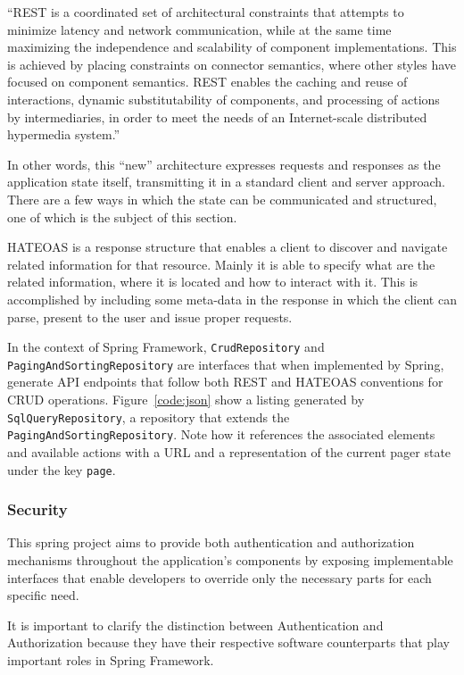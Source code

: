 \begin{displayquote}
  ``REST is a coordinated set of architectural constraints that attempts to minimize latency and network communication, while at the same time maximizing the independence and scalability of component implementations. This is achieved  by  placing  constraints  on  connector  semantics,  where  other  styles have focused on component semantics. REST enables the caching and reuse of interactions, dynamic substitutability of components, and processing of actions by intermediaries, in order to meet the needs of an Internet-scale distributed hypermedia system.''~\cite{fielding}
\end{displayquote}

In other words, this ``new'' architecture expresses requests and responses as the application state itself, transmitting it in a standard client and server approach. There are a few ways in which the state can be communicated and structured, one of which is the subject of this section. 

\gls{HATEOAS} is a response structure that enables a client to discover and navigate related information for that resource\cite{fielding}. Mainly it is able to specify what are the related information, where it is located and how to interact with it. This is accomplished by including some meta-data in the response in which the client can parse, present to the user and issue proper requests.

In the context of Spring Framework, \texttt{CrudRepository} and \texttt{PagingAndSortingRepository} are interfaces that when implemented by Spring, generate \gls{API} endpoints that follow both \gls{REST} and \gls{HATEOAS} conventions for \gls{CRUD} operations. Figure~\ref{code:json} show a listing generated by \texttt{SqlQueryRepository}, a repository that extends the \texttt{PagingAndSortingRepository}. Note how it references the associated elements and available actions with a \gls{URL} and a representation of the current pager state under the key \texttt{page}.

\subsubsection{Security}
This spring project aims to provide both authentication and authorization mechanisms throughout the application's components by exposing implementable interfaces that enable developers to override only the necessary parts for each specific need.

It is important to clarify the distinction between Authentication and Authorization because they have their respective software counterparts that play important roles in Spring Framework.

